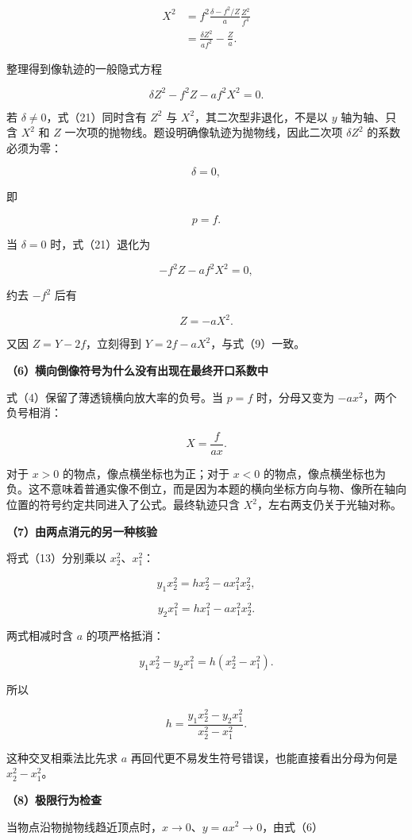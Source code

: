\documentclass[12pt,a4paper,UTF8]{ctexart}
\begin{document}
\[
\begin{aligned}
X^2
&=f^2\frac{\delta-f^2/Z}{a}
\frac{Z^2}{f^4}\\
&=\frac{\delta Z^2}{af^2}-\frac Za.
\end{aligned}
\]

整理得到像轨迹的一般隐式方程

\[
\boxed{
\delta Z^2-f^2Z-af^2X^2=0
}.
\tag{21}
\]

若 \(\delta\ne0\)，式（21）同时含有 \(Z^2\) 与
\(X^2\)，其二次型非退化，不是以 \(y\) 轴为轴、只含 \(X^2\) 和 \(Z\)
一次项的抛物线。题设明确像轨迹为抛物线，因此二次项 \(\delta Z^2\)
的系数必须为零：

\[
\delta=0,
\]

即

\[
p=f.
\]

当 \(\delta=0\) 时，式（21）退化为

\[
-f^2Z-af^2X^2=0,
\]

约去 \(-f^2\) 后有

\[
Z=-aX^2.
\]

又因 \(Z=Y-2f\)，立刻得到 \(Y=2f-aX^2\)，与式（9）一致。

\textbf{（6）横向倒像符号为什么没有出现在最终开口系数中}

式（4）保留了薄透镜横向放大率的负号。当 \(p=f\) 时，分母又变为
\(-ax^2\)，两个负号相消：

\[
X=\frac{f}{ax}.
\]

对于 \(x>0\) 的物点，像点横坐标也为正；对于 \(x<0\)
的物点，像点横坐标也为负。这不意味着普通实像不倒立，而是因为本题的横向坐标方向与物、像所在轴向位置的符号约定共同进入了公式。最终轨迹只含
\(X^2\)，左右两支仍关于光轴对称。

\textbf{（7）由两点消元的另一种核验}

将式（13）分别乘以 \(x_2^2\)、\(x_1^2\)：

\[
y_1x_2^2=hx_2^2-ax_1^2x_2^2,
\]

\[
y_2x_1^2=hx_1^2-ax_1^2x_2^2.
\]

两式相减时含 \(a\) 的项严格抵消：

\[
y_1x_2^2-y_2x_1^2
=h(x_2^2-x_1^2).
\]

所以

\[
h=\frac{y_1x_2^2-y_2x_1^2}{x_2^2-x_1^2}.
\]

这种交叉相乘法比先求 \(a\)
再回代更不易发生符号错误，也能直接看出分母为何是 \(x_2^2-x_1^2\)。

\textbf{（8）极限行为检查}

当物点沿物抛物线趋近顶点时，\(x\to0\)、\(y=ax^2\to0\)，由式（6）
\end{document}

